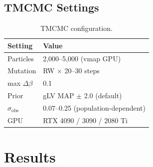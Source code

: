 \documentclass[11pt,a4paper]{article}
\begin{document}
\subsection{TMCMC Settings}

\begin{table}[H]\centering\small
\caption{TMCMC configuration.}
\begin{tabular}{ll}
\toprule
Setting & Value \\
\midrule
Particles & 2{,}000--5{,}000 (vmap GPU) \\
Mutation & RW $\times$ 20--30 steps \\
max $\Delta\beta$ & 0.1 \\
Prior & gLV MAP $\pm$ 2.0 (default) \\
$\sigma_\mathrm{obs}$ & 0.07--0.25 (population-dependent) \\
GPU & RTX 4090 / 3090 / 2080 Ti \\
\bottomrule
\end{tabular}
\end{table}

\section{Results}
\end{document}
